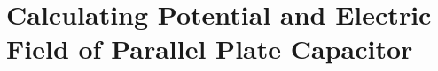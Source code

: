 \section{Calculating Potential and Electric Field of Parallel Plate Capacitor}
\label{sec:parallel_plate_capacitor}